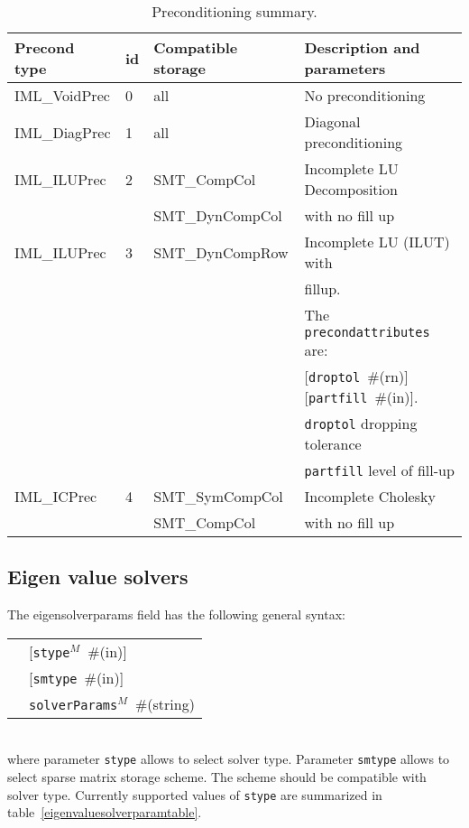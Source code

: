 \documentclass[a4paper]{article}
\newcommand{\param}[1]{\texttt{#1}} %
\newcommand{\optional}[1]{[#1]} %
\newcommand{\field}[2]{\param{#1}~\#{\tiny(#2)}} %
\newcommand{\optField}[2]{\optional{\field{#1}{#2}}}
\newenvironment{record}[1][]{\begin{tabular}{|ll}}{\end{tabular}\\}
\newcommand{\recentry}[2]{{#1}&{#2}\\}
\newcounter{rcc}
\newenvironment{record}[1][\textwidth]{\setcounter{rcc}{0}\rowcolors{1}{lightgray}{lightgray}\tabularx{#1}{llR} \hline}
               {\endtabularx}
\newcommand{\recentry}[2]{\ifthenelse{\value{rcc}>0}{$\backslash$ \\}{\setcounter{rcc}{1}}{#1}&{#2}&}
\begin{document}
\begin{table}[ht]
\begin{center}
\begin{tabular}{|l|l|l|l|}
\hline
Precond type & id & Compatible storage & Description and parameters \\
\hline\hline
IML\_VoidPrec &0& all & No preconditioning\\
\hline
IML\_DiagPrec &1& all & Diagonal preconditioning\\
\hline
IML\_ILUPrec  &2& SMT\_CompCol & Incomplete LU Decomposition\\
              & & SMT\_DynCompCol&with no fill up\\
\hline
IML\_ILUPrec  &3& SMT\_DynCompRow & Incomplete LU (ILUT) with\\
              & &                 &  fillup. \\
              & &                 & The \param{precondattributes} are:\\
              & &                 & \optField{droptol}{rn} \optField{partfill}{in}.\\
              & &                 & \param{droptol} dropping tolerance\\
              & &                 & \param{partfill} level of fill-up\\
\hline
IML\_ICPrec   &4& SMT\_SymCompCol&Incomplete Cholesky\\
              & & SMT\_CompCol   &with no fill up\\
\hline
\end{tabular}
\caption{Preconditioning summary.}
\label{precondtable}
\end{center}
\end{table}

\subsection{Eigen value solvers}
\label{eigensolverssection}
The eigensolverparams field has the following general syntax:\\
\begin{record}
  \recentry{\hspace{20mm}}{\optField{stype$^M$}{in}}
  \recentry{}{\optField{smtype}{in}}
  \recentry{}{\field{solverParams$^M$}{string}}
\end{record}
where parameter \param{stype} allows to select solver type. Parameter \param{smtype} allows to select sparse matrix storage
scheme. The scheme should be compatible with solver type. Currently supported values of \param{stype} are summarized in table~\ref{eigenvaluesolverparamtable}.
\end{document}

